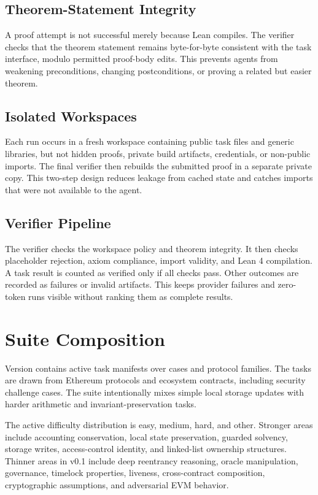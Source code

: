 \documentclass[conference]{IEEEtran}
\newcommand{\lean}{Lean 4}
\begin{document}
\subsection{Theorem-Statement Integrity}

A proof attempt is not successful merely because Lean compiles. The verifier
checks that the theorem statement remains byte-for-byte consistent with the
task interface, modulo permitted proof-body edits. This prevents agents from
weakening preconditions, changing postconditions, or proving a related but
easier theorem.

\subsection{Isolated Workspaces}

Each run occurs in a fresh workspace containing public task files and generic
libraries, but not hidden proofs, private build artifacts, credentials, or
non-public imports. The final verifier then rebuilds the submitted proof in a
separate private copy. This two-step design reduces leakage from cached state
and catches imports that were not available to the agent.

\subsection{Verifier Pipeline}

The verifier checks the workspace policy and theorem integrity. It then checks
placeholder rejection, axiom compliance, import validity, and \lean{}
compilation. A task result is counted as verified only if all checks pass. Other
outcomes are recorded as failures or invalid artifacts. This keeps provider
failures and zero-token runs visible without ranking them as complete results.

\section{Suite Composition}

Version \BenchmarkVersion{} contains \BenchmarkTaskCount{} active task
manifests over \BenchmarkCaseCount{} cases and \BenchmarkFamilyCount{} protocol
families. The tasks are drawn from Ethereum protocols and ecosystem contracts,
including security challenge cases. The suite intentionally mixes simple local
storage updates with harder arithmetic and invariant-preservation tasks.

The active difficulty distribution is \BenchmarkEasyTasks{} easy,
\BenchmarkMediumTasks{} medium, \BenchmarkHardTasks{} hard, and
\BenchmarkOtherDifficultyTasks{} other. Stronger areas include accounting
conservation, local state preservation, guarded solvency, storage writes,
access-control identity, and linked-list ownership structures. Thinner areas in
v0.1 include deep reentrancy reasoning, oracle manipulation, governance,
timelock properties, liveness, cross-contract composition, cryptographic
assumptions, and adversarial EVM behavior.
\end{document}
